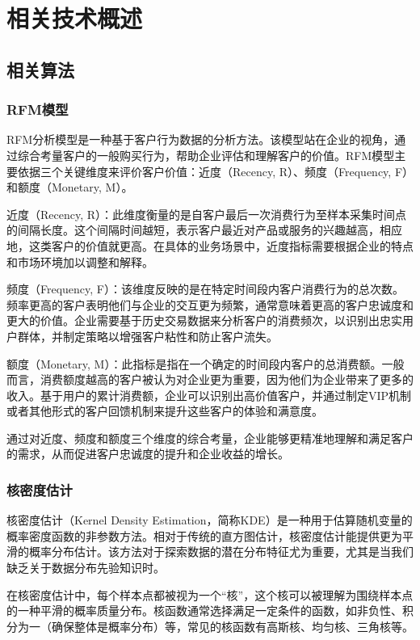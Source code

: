 \chapter{相关技术概述}
\section{相关算法}
\subsection{RFM模型}
RFM分析模型\cite{hughes2005strategic}是一种基于客户行为数据的分析方法。该模型站在企业的视角，通过综合考量客户的一般购买行为，帮助企业评估和理解客户的价值。RFM模型主要依据三个关键维度来评价客户价值：近度（Recency, R）、频度（Frequency, F）和额度（Monetary, M）。

近度（Recency, R）：此维度衡量的是自客户最后一次消费行为至样本采集时间点的间隔长度。这个间隔时间越短，表示客户最近对产品或服务的兴趣越高，相应地，这类客户的价值就更高。在具体的业务场景中，近度指标需要根据企业的特点和市场环境加以调整和解释。

频度（Frequency, F）：该维度反映的是在特定时间段内客户消费行为的总次数。频率更高的客户表明他们与企业的交互更为频繁，通常意味着更高的客户忠诚度和更大的价值。企业需要基于历史交易数据来分析客户的消费频次，以识别出忠实用户群体，并制定策略以增强客户粘性和防止客户流失。

额度（Monetary, M）：此指标是指在一个确定的时间段内客户的总消费额。一般而言，消费额度越高的客户被认为对企业更为重要，因为他们为企业带来了更多的收入。基于用户的累计消费额，企业可以识别出高价值客户，并通过制定VIP机制或者其他形式的客户回馈机制来提升这些客户的体验和满意度。

通过对近度、频度和额度三个维度的综合考量，企业能够更精准地理解和满足客户的需求，从而促进客户忠诚度的提升和企业收益的增长。
\subsection{核密度估计}
核密度估计\cite{10.1214/aoms/1177728190}（Kernel Density Estimation，简称KDE）是一种用于估算随机变量的概率密度函数的非参数方法。相对于传统的直方图估计，核密度估计能提供更为平滑的概率分布估计。该方法对于探索数据的潜在分布特征尤为重要，尤其是当我们缺乏关于数据分布先验知识时。

在核密度估计中，每个样本点都被视为一个“核”，这个核可以被理解为围绕样本点的一种平滑的概率质量分布。核函数通常选择满足一定条件的函数，如非负性、积分为一（确保整体是概率分布）等，常见的核函数有高斯核、均匀核、三角核等。

